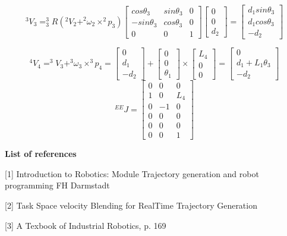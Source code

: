 \documentclass[12pt]{article}
\begin{document}
\[
^3 V_3 = ^3_3 R\left(^2V_2+^2\omega_2\times ^2p_3\right)\left[
\begin{array}{ccc}
cos\theta_3 & sin\theta_3 & 0 \\
-sin\theta_3 & cos\theta_3 & 0\\
0 & 0 & 1 
\end{array} \right]
\left[
\begin{array}{c}
0\\
0\\
d_2
\end{array} \right] = 
\left[
\begin{array}{c}
d_1 sin\theta_3\\
d_1 cos\theta_3\\
-d_2
\end{array} \right] \]

\[
^4 V_4 = ^3V_3 + ^3\omega_3\times ^3 p_4=
\left[
\begin{array}{c}
0\\
d_1 \\
-d_2
\end{array} \right]+
\left[
\begin{array}{c}
0\\
0 \\
\theta_1
\end{array} \right]\times
\left[
\begin{array}{c}
L_4\\
0\\
0
\end{array} \right] = 
\left[
\begin{array}{c}
0\\
d_1 +L_1\theta_3\\
-d_2
\end{array} \right]
\]
\[
^{EE}J=
\left[
\begin{array}{ccc}
0 & 0 & 0\\
1 & 0 & L_4\\
0 & -1 & 0\\
0 & 0 & 0\\
0 & 0 & 0\\
0 & 0 & 1
\end{array} \right] 
\]
\medskip

\textbf{List of references}

[1] Introduction to Robotics: Module Trajectory generation and robot programming FH Darmstadt

[2] Task Space velocity Blending for RealTime Trajectory Generation

[3] A Texbook of Industrial Robotics, p. 169
\end{document}
